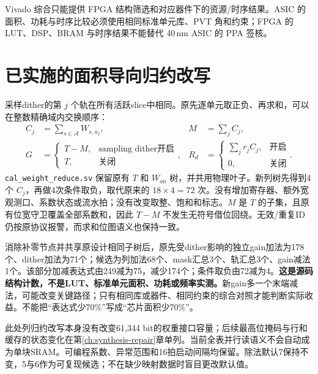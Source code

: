 \documentclass[UTF8,fontset=fandol,11pt,a4paper,openany]{ctexrep}
\newcommand{\code}[1]{\nolinkurl{#1}}
\begin{document}
Vivado 综合只能提供 FPGA 结构筛选和对应器件下的资源/时序结果。ASIC 的面积、功耗与时序比较必须使用相同标准单元库、PVT 角和约束；FPGA 的 LUT、DSP、BRAM 与时序结果不能替代 40\,nm ASIC 的 PPA 签核。


\section{已实施的面积导向归约改写}
采样dither的第 \(j\) 个轨在所有活跃slice中相同。原先逐单元取正负、再求和，可以在整数精确域内交换顺序：
\begin{align}
C_j &= \sum_{s\in\mathcal A}W_{s,u_j}, & M &= \sum_j C_j,\\
G &= \begin{cases}T-M,&\text{sampling dither开启}\\T,&\text{关闭}\end{cases}, &
R_d &= \begin{cases}\sum_j r_j C_j,&\text{开启}\\0,&\text{关闭}\end{cases}.
\end{align}
\code{cal_weight_reduce.sv} 保留原有 \(T\) 和 \(W_{on}\) 树，并共用物理叶子。新列树先得到4个 \(C_j\)，再做4次条件取负，取代原来的 \(18\times4=72\) 次。没有增加寄存器、额外宽观测口、系数状态或流水拍；没有改变取整、饱和和标志。\(M\) 是 \(T\) 的子集，且原有位宽守卫覆盖全部系数和，因此 \(T-M\) 不发生无符号借位回绕。无效/重复ID仍按原协议报警，而求和位图语义也保持一致。

消除补零节点并共享原设计相同子树后，原先受dither影响的独立gain加法为178个、dither加法为71个；候选为列加法68个、mask汇总3个、轨汇总3个、gain减法1个。该部分加减表达式由249减为75，减少174个；条件取负由72减为4。\textbf{这是源码结构计数，不是LUT、标准单元面积、功耗或频率实测。}新gain多一个末端减法，可能改变关键路径；只有相同库或器件、相同约束的综合对照才能判断实际收益。不能把“表达式少70\%”写成“芯片面积少70\%”。

此处列归约改写本身没有改变61,344 bit的权重接口容量；后续最高位掩码与行和缓存的状态变化在第\ref{ch:synthesis-repair}章单列。当前全表并行读语义不会自动成为单块SRAM。可编程系数、异常范围和16拍启动间隔均保留。除法默认7保持不变，5与6作为可复现候选；不在缺少映射数据时盲目更改默认值。
\end{document}
